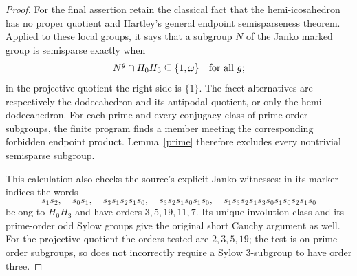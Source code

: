 \documentclass[11pt,a4paper]{article}
\begin{document}
\begin{proof}
For the final assertion retain the classical fact that the hemi-icosahedron has no proper quotient and Hartley's general endpoint semisparseness theorem. Applied to these local groups, it says that a subgroup $N$ of the Janko marked group is semisparse exactly when
\[
 N^g\cap H_0H_3\subseteq\{1,\omega\}\quad\hbox{for all }g;
\]
in the projective quotient the right side is $\{1\}$. The facet alternatives are respectively the dodecahedron and its antipodal quotient, or only the hemi-dodecahedron. For each prime and every conjugacy class of prime-order subgroups, the finite program finds a member meeting the corresponding forbidden endpoint product. Lemma~\ref{prime} therefore excludes every nontrivial semisparse subgroup.

This calculation also checks the source's explicit Janko witnesses: in its marker indices the words
\[
 s_1s_2,\quad s_0s_1,\quad s_3s_1s_2s_1s_0,\quad
 s_3s_2s_1s_0s_1s_0,\quad
 s_1s_3s_2s_1s_3s_0s_1s_0s_2s_1s_0
\]
belong to $H_0H_3$ and have orders $3,5,19,11,7$. Its unique involution class and its prime-order odd Sylow groups give the original short Cauchy argument as well. For the projective quotient the orders tested are $2,3,5,19$; the test is on prime-order subgroups, so does not incorrectly require a Sylow $3$-subgroup to have order three.
\end{proof}
\end{document}
